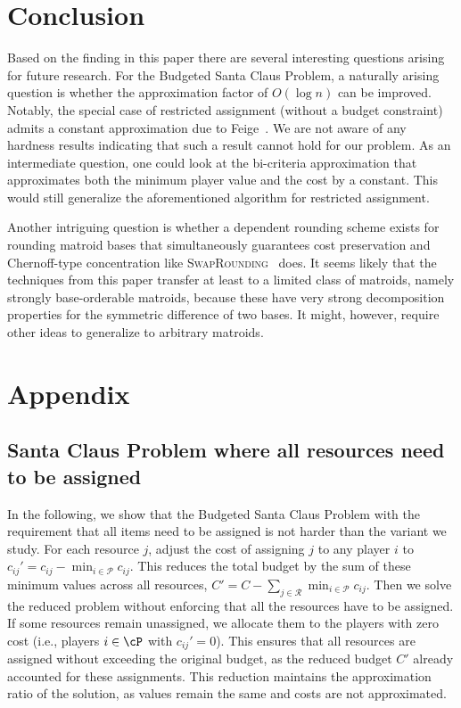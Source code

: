 \documentclass[a4paper,USenglish,cleveref,thm-restate]{lipics-v2021}
\begin{document}
 \section{Conclusion}
Based on the finding in this paper there are several interesting questions arising for future research.
For the Budgeted Santa Claus Problem, a naturally arising question is whether the approximation factor of
$O(\log n)$ can be improved. Notably, the special case of restricted assignment (without a budget constraint)
admits a constant approximation due to Feige~\cite{Feige08}.
We are not aware of any hardness
results indicating that such a result cannot hold for our problem. As an intermediate question,
one could look at the bi-criteria approximation that approximates both the minimum player value and the cost by a constant. This would still generalize the aforementioned algorithm for restricted assignment.

Another intriguing question is whether a dependent rounding scheme exists for rounding matroid bases that simultaneously guarantees cost preservation and Chernoff-type concentration 
like \textsc{SwapRounding}~\cite{ChekuriVZ10} does. 
It seems likely that the techniques from this paper
transfer at least to a limited
class of matroids, namely strongly base-orderable
matroids, because
these have very strong decomposition properties for the
symmetric difference of two bases.
It might, however, require other ideas to generalize to
arbitrary matroids. 



\appendix
\section{Appendix}

\subsection{Santa Claus Problem where all resources need to be assigned}
\label{subsec:appendix-santa-claus-with-all-resources-assigned}
In the following, we show that the Budgeted Santa Claus Problem with the requirement that all items need to be assigned is not harder than the variant we study. 
For each resource $j$, adjust the cost of assigning $j$ to any player $i$ to $c_{ij}' = c_{ij} - \min_{i \in \mathcal{P}} c_{ij}$. This reduces the total budget by the sum of these minimum values across all resources, $C' = C - \sum_{j \in \mathcal{R}} \min_{i \in \mathcal{P}} c_{ij}$. Then we solve the reduced problem without enforcing that all the resources have to be assigned. If some resources remain unassigned, we allocate them to the players with zero cost (i.e., players $i \in \cP$ with $c_{ij}'  = 0$). This ensures that all resources are assigned without exceeding the original budget, as the reduced budget $C'$ already accounted for these assignments. This reduction maintains the approximation ratio of the solution, as values remain the same and costs are not approximated. 
\end{document}
